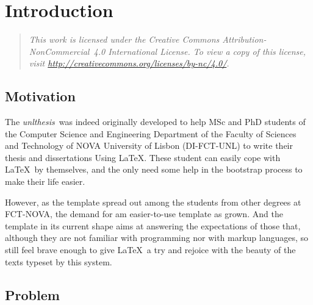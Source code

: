 \newcommand{\unlthesis}{\emph{unlthesis}}
\newcommand{\unlthesisclass}{\texttt{unlthesis.cls}}

\chapter{Introduction}
\label{cha:introduction}

\begin{quotation}
  \itshape
  This work is licensed under the Creative Commons Attribution-NonCommercial~4.0 International License.
  To view a copy of this license, visit \url{http://creativecommons.org/licenses/by-nc/4.0/}.
\end{quotation}

\section{Motivation} %
\label{sec:a_bit_of_history}

The \unlthesis\ was indeed  originally developed to help MSc and PhD students of the Computer Science and Engineering Department of the Faculty of Sciences and Technology of NOVA University of Lisbon (DI-FCT-UNL) to write their thesis and dissertations Using \LaTeX.
%
These student can easily cope with \LaTeX\ by themselves, and the only need some help in the bootstrap process to make their life easier.

However, as the template spread out among the students from other degrees at FCT-NOVA, the demand for am easier-to-use template as grown.
%
And the template in its current shape aims at answering the expectations of those that, although they are not familiar with programming nor with markup languages, so still feel brave enough to give \LaTeX\ a try and rejoice with the beauty of the texts typeset by this system.



\section{Problem} %
\label{sec:disclaimer}

